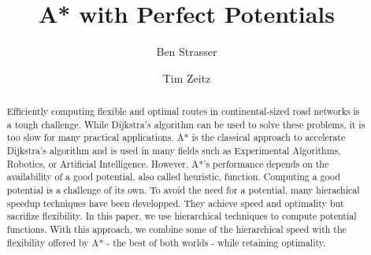 \documentclass[sigconf]{acmart}
\begin{document}
%
\title{A* with Perfect Potentials}

\author{Ben Strasser}
\affiliation{}

\author{Tim Zeitz}


\begin{abstract}
Efficiently computing flexible and optimal routes in continental-sized road networks is a tough challenge.
While Dijkstra's algorithm can be used to solve these problems, it is too slow for many practical applications.
A* is the classical approach to accelerate Dijkstra's algorithm and is used in many fields such as Experimental Algorithms, Robotics, or Artificial Intelligence.
However, A*'s performance depends on the availability of a good potential, also called heuristic, function.
Computing a good potential is a challenge of its own.
To avoid the need for a potential, many hierachical speedup techniques have been developped.
They achieve speed and optimality but sacrifize flexibility.
In this paper, we use hierarchical techniques to compute potential functions.
With this approach, we combine some of the hierarchical speed with the flexibility offered by A* - the best of both worlds - while retaining optimality.
\end{abstract}
\end{document}

